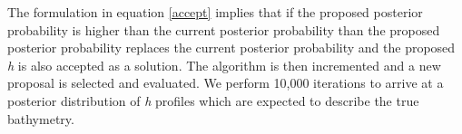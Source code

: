 The formulation in equation \ref{accept} implies that if the proposed posterior probability is higher than the current posterior probability than the proposed posterior probability replaces the current posterior probability and the proposed \textit{h} is also accepted as a solution. The algorithm is then incremented and a new proposal is selected and evaluated. We perform 10,000 iterations to arrive at a posterior distribution of \textit{h} profiles which are expected to describe the true bathymetry.















